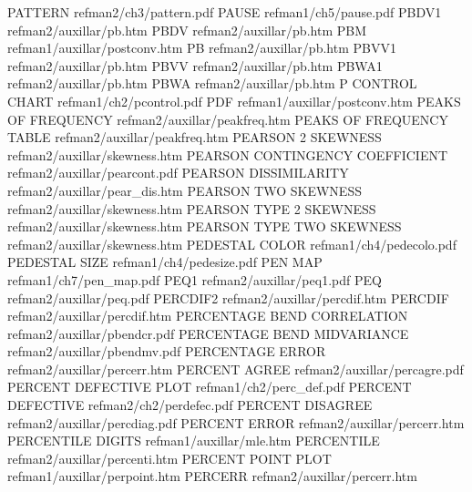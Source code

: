 PATTERN                                 refman2/ch3/pattern.pdf
PAUSE                                   refman1/ch5/pause.pdf
PBDV1                                   refman2/auxillar/pb.htm
PBDV                                    refman2/auxillar/pb.htm
PBM                                     refman1/auxillar/postconv.htm
PB                                      refman2/auxillar/pb.htm
PBVV1                                   refman2/auxillar/pb.htm
PBVV                                    refman2/auxillar/pb.htm
PBWA1                                   refman2/auxillar/pb.htm
PBWA                                    refman2/auxillar/pb.htm
P CONTROL CHART                         refman1/ch2/pcontrol.pdf
PDF                                     refman1/auxillar/postconv.htm
PEAKS OF FREQUENCY                      refman2/auxillar/peakfreq.htm
PEAKS OF FREQUENCY TABLE                refman2/auxillar/peakfreq.htm
PEARSON 2 SKEWNESS                      refman2/auxillar/skewness.htm
PEARSON CONTINGENCY COEFFICIENT         refman2/auxillar/pearcont.pdf
PEARSON DISSIMILARITY                   refman2/auxillar/pear_dis.htm
PEARSON TWO SKEWNESS                    refman2/auxillar/skewness.htm
PEARSON TYPE 2 SKEWNESS                 refman2/auxillar/skewness.htm
PEARSON TYPE TWO SKEWNESS               refman2/auxillar/skewness.htm
PEDESTAL COLOR                          refman1/ch4/pedecolo.pdf
PEDESTAL SIZE                           refman1/ch4/pedesize.pdf
PEN MAP                                 refman1/ch7/pen_map.pdf
PEQ1                                    refman2/auxillar/peq1.pdf
PEQ                                     refman2/auxillar/peq.pdf
PERCDIF2                                refman2/auxillar/percdif.htm
PERCDIF                                 refman2/auxillar/percdif.htm
PERCENTAGE BEND CORRELATION             refman2/auxillar/pbendcr.pdf
PERCENTAGE BEND MIDVARIANCE             refman2/auxillar/pbendmv.pdf
PERCENTAGE ERROR                        refman2/auxillar/percerr.htm
PERCENT AGREE                           refman2/auxillar/percagre.pdf
PERCENT DEFECTIVE PLOT                  refman1/ch2/perc_def.pdf
PERCENT DEFECTIVE                       refman2/ch2/perdefec.pdf
PERCENT DISAGREE                        refman2/auxillar/percdiag.pdf
PERCENT ERROR                           refman2/auxillar/percerr.htm
PERCENTILE DIGITS                       refman1/auxillar/mle.htm
PERCENTILE                              refman2/auxillar/percenti.htm
PERCENT POINT PLOT                      refman1/auxillar/perpoint.htm
PERCERR                                 refman2/auxillar/percerr.htm
